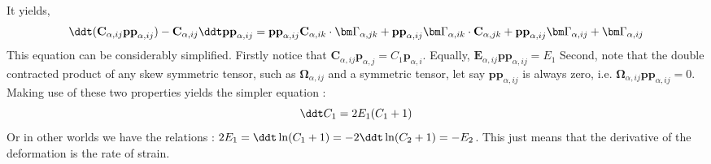 It yields, 
\begin{equation*}
    \ddt (\textbf{C}_{\alpha,ij} \textbf{pp}_{\alpha,ij})
    - \textbf{C}_{\alpha,ij} \ddt \textbf{pp}_{\alpha,ij} 
    = \textbf{pp}_{\alpha,ij} \textbf{C}_{\alpha,ik} \cdot \bm\Gamma_{\alpha,jk}
    + \textbf{pp}_{\alpha,ij}  \bm\Gamma_{\alpha,ik} \cdot \textbf{C}_{\alpha,jk}
    + \textbf{pp}_{\alpha,ij}  \bm\Gamma_{\alpha,ij} + \bm\Gamma_{\alpha,ij}
\end{equation*}
This equation can be considerably simplified.
Firstly notice that $\textbf{C}_{\alpha,ij} \textbf{p}_{\alpha,j} = C_1 \textbf{p}_{\alpha,i}$. 
Equally, $\textbf{E}_{\alpha,ij} \textbf{pp}_{\alpha,ij} =E_1$
Second, note that the double contracted product of any skew symmetric tensor, such as $\bm\Omega_{\alpha,ij}$ and a symmetric tensor, let say $\textbf{pp}_{\alpha,ij}$ is always zero, i.e. $\bm\Omega_{\alpha,ij}\textbf{pp}_{\alpha,ij} = 0$.
Making use of these two properties yields the simpler equation : 
\begin{equation*}
    \ddt C_1
    = 2E_1(C_1+1)
\end{equation*}
Or in other worlds we have the relations : $2 E_1 = \ddt \ln(C_1+1) = - 2 \ddt \ln(C_2+1) = - E_2 $. 
This just means that the derivative of the deformation is the rate of strain. 

